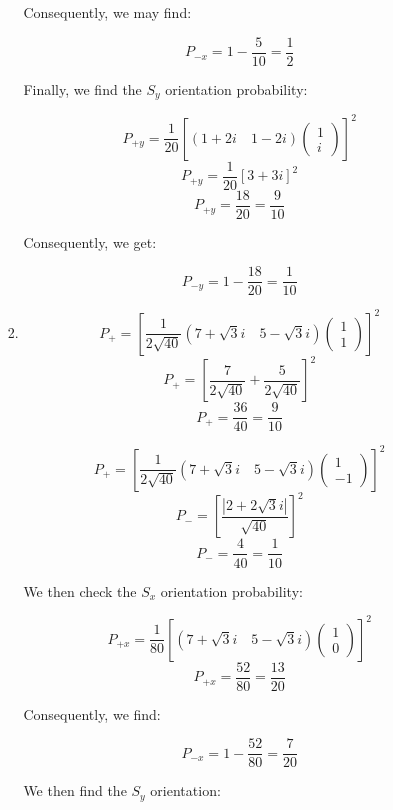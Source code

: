\begin{enumerate}
\begin{enumerate}
\begin{enumerate}
            Consequently, we may find:

            $$\boxed{P_{-x}=1-\frac{5}{10}=\frac{1}{2}}$$

            Finally, we find the $S_y$ orientation probability:

            $$P_{+y}=\frac{1}{20}\left[\left( 1+2i\quad 1-2i \right)\left( \begin{matrix} 1\\ i\end{matrix} \right)\right]^2$$
            $$P_{+y}=\frac{1}{20}\left[3+3i\right]^2$$
            $$\boxed{P_{+y}=\frac{18}{20}=\frac{9}{10}}$$

            Consequently, we get:

            $$\boxed{P_{-y}=1-\frac{18}{20}=\frac{1}{10}}$$

          \item 

            $$P_+=\left[\frac{1}{2\sqrt{40}}\left( 7+\sqrt{3}i \quad 5-\sqrt{3}i \right)\left( \begin{matrix} 1\\ 1\end{matrix} \right)\right]^2$$
            $$P_+=\left[\frac{7}{2\sqrt{40}}+\frac{5}{2\sqrt{40}}\right]^2$$
            $$\boxed{P_+=\frac{36}{40}=\frac{9}{10}}$$

            $$P_+=\left[\frac{1}{2\sqrt{40}}\left( 7+\sqrt{3}i \quad 5-\sqrt{3}i \right)\left( \begin{matrix} 1\\ -1\end{matrix} \right)\right]^2$$
            $$P_-=\left[\frac{|2+2\sqrt{3}i|}{\sqrt{40}}\right]^2$$
            $$\boxed{P_-=\frac{4}{40}=\frac{1}{10}}$$

            We then check the $S_x$ orientation probability:

            $$P_{+x}=\frac{1}{80}\left[\left( 7+\sqrt{3}i \quad 5-\sqrt{3}i \right)\left( \begin{matrix} 1\\ 0\end{matrix} \right)\right]^2$$
            $$\boxed{P_{+x}=\frac{52}{80}=\frac{13}{20}}$$

            Consequently, we find:

            $$\boxed{P_{-x}=1-\frac{52}{80}=\frac{7}{20}}$$

            We then find the $S_y$ orientation:


\end{enumerate}
\end{enumerate}
\end{enumerate}
